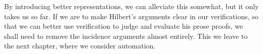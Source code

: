 By introducing better representations, we can alleviate this somewhat, but it only takes us so far. If we are to make Hilbert's arguments clear in our verifications, so that we can better use verification to judge and evaluate his prose proofs, we shall need to remove the incidence arguments almost entirely. This we leave to the next chapter, where we consider automation.

